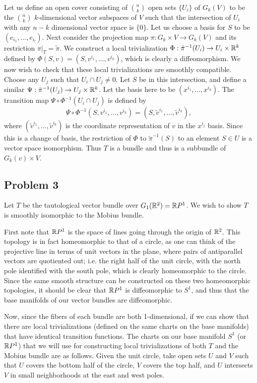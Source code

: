 \documentclass{../../mathnotes}
\begin{document}
Let us define an open cover consisting of $\binom{n}{k}$ open sets $\{U_i\}$ of $G_k(V)$ to be the $\binom{n}{k}$ $k$-dimensional vector subspaces of $V$
such that the intersection of $U_i$ with any $n-k$ dimensional vector space is $\{0\}$. Let us choose a basis for $S$ to be $(e_{i_1}, \dots, e_{i_l})$.
Next consider the projection map $\pi : G_k \times V \to G_k(V)$ and its restriction $\pi|_T = \tilde{\pi}$.
We construct a local trivialization $\Phi : \tilde{\pi}^{-1}(U_i) \to U_i \times \mathbb{R}^k$ defined by $\Phi(S,v) = (S, v^{i_1}, \dots, v^{i_k})$, which
is clearly a diffeomorphism.
We now wish to check that these local trivializations are smoothly compatible. Choose any $U_j$ such that $U_i \cap U_j \neq 0$. Let $S$ be in this intersection, and define a similar $\Psi : \tilde{\pi}^{-1}(U_j) \to U_j \times \mathbb{R}^k$.
Let the basis here to be $(x^{i_1}, \dots, x^{i_k})$. The transition map $\Psi \circ \Phi^{-1}(U_i \cap U_j)$ is defined by
\[ \Psi \circ \Phi^{-1}(S, v^{i_1}, \dots, v^{i_k}) = (S, \tilde{v}^{i_1}, \dots, \tilde{v}^{i_k}), \] where $(\tilde{v}^{i_1}, \dots, \tilde{v}^{i_k})$
is the coordinate representation of $v$ in the $x^{i_j}$ basis.
Since this is a change of basis, the restriction of $\Phi$ to $\tilde{\pi}^{-1}(S)$ to an element $S \in U$ is a vector space isomorphism.
Thus $T$ is a bundle and thus is a subbundle of $G_k(v) \times V$. 

\subsection*{Problem 3}

Let $T$ be the tautological vector bundle over $G_1(\mathbb{R}^2)=\mathbb{R} P^1$. We wish to show $T$ is smoothly isomorphic
to the Mobius bundle.

First note that $\mathbb{R} P^1$ is the space of lines going through the origin of $\mathbb{R}^2$. This topology
is in fact homeomorphic to that of a circle, as one can think of the projective line in terms of unit vectors in the plane, where
pairs of antiparallel vectors are quotiented out; i.e. the right half of the unit circle, with the north pole identified with the south
pole, which is clearly homeomorphic to the circle. Since the same smooth structure can be constructed on these two homeomorphic topologies,
it should be clear that $\mathbb{R} P^1$ is diffeomorphic to $S^1$, and thus that the base manifolds of our vector bundles are diffeomorphic.

Now, since the fibers of each bundle are both 1-dimensional, if we can show that there are local trivializations
(defined on the same charts on the base manifolds) that have identical transition functions. The charts on our base manifold $S^1$
(or $\mathbb{R} P^1$) that we will use for constructing local trivializations of both $T$ and the Mobius bundle are as follows. Given
the unit circle, take open sets $U$ and $V$ such that $U$ covers the bottom half of the circle, $V$ covers the top half, and $U$
intersects $V$ in small neighborhoods at the east and west poles.
\end{document}

